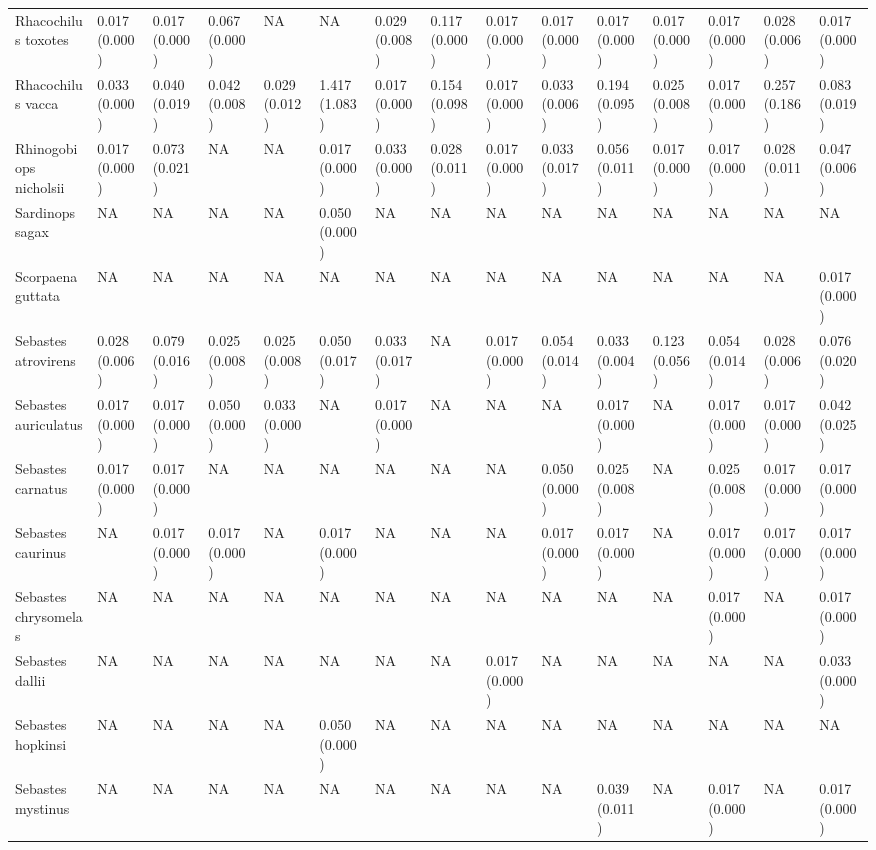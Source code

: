 \documentclass[12pt,]{article}
\begin{document}
\begin{landscape}
\begin{table}
{\begin{tabular}[t]{lllllllllllllll}
Rhacochilus toxotes & 0.017 (0.000) & 0.017 (0.000) & 0.067 (0.000) & NA & NA & 0.029 (0.008) & 0.117 (0.000) & 0.017 (0.000) & 0.017 (0.000) & 0.017 (0.000) & 0.017 (0.000) & 0.017 (0.000) & 0.028 (0.006) & 0.017 (0.000)\\
Rhacochilus vacca & 0.033 (0.000) & 0.040 (0.019) & 0.042 (0.008) & 0.029 (0.012) & 1.417 (1.083) & 0.017 (0.000) & 0.154 (0.098) & 0.017 (0.000) & 0.033 (0.006) & 0.194 (0.095) & 0.025 (0.008) & 0.017 (0.000) & 0.257 (0.186) & 0.083 (0.019)\\
Rhinogobiops nicholsii & 0.017 (0.000) & 0.073 (0.021) & NA & NA & 0.017 (0.000) & 0.033 (0.000) & 0.028 (0.011) & 0.017 (0.000) & 0.033 (0.017) & 0.056 (0.011) & 0.017 (0.000) & 0.017 (0.000) & 0.028 (0.011) & 0.047 (0.006)\\
\addlinespace
Sardinops sagax & NA & NA & NA & NA & 0.050 (0.000) & NA & NA & NA & NA & NA & NA & NA & NA & NA\\
Scorpaena guttata & NA & NA & NA & NA & NA & NA & NA & NA & NA & NA & NA & NA & NA & 0.017 (0.000)\\
Sebastes atrovirens & 0.028 (0.006) & 0.079 (0.016) & 0.025 (0.008) & 0.025 (0.008) & 0.050 (0.017) & 0.033 (0.017) & NA & 0.017 (0.000) & 0.054 (0.014) & 0.033 (0.004) & 0.123 (0.056) & 0.054 (0.014) & 0.028 (0.006) & 0.076 (0.020)\\
Sebastes auriculatus & 0.017 (0.000) & 0.017 (0.000) & 0.050 (0.000) & 0.033 (0.000) & NA & 0.017 (0.000) & NA & NA & NA & 0.017 (0.000) & NA & 0.017 (0.000) & 0.017 (0.000) & 0.042 (0.025)\\
Sebastes carnatus & 0.017 (0.000) & 0.017 (0.000) & NA & NA & NA & NA & NA & NA & 0.050 (0.000) & 0.025 (0.008) & NA & 0.025 (0.008) & 0.017 (0.000) & 0.017 (0.000)\\
\addlinespace
Sebastes caurinus & NA & 0.017 (0.000) & 0.017 (0.000) & NA & 0.017 (0.000) & NA & NA & NA & 0.017 (0.000) & 0.017 (0.000) & NA & 0.017 (0.000) & 0.017 (0.000) & 0.017 (0.000)\\
Sebastes chrysomelas & NA & NA & NA & NA & NA & NA & NA & NA & NA & NA & NA & 0.017 (0.000) & NA & 0.017 (0.000)\\
Sebastes dallii & NA & NA & NA & NA & NA & NA & NA & 0.017 (0.000) & NA & NA & NA & NA & NA & 0.033 (0.000)\\
Sebastes hopkinsi & NA & NA & NA & NA & 0.050 (0.000) & NA & NA & NA & NA & NA & NA & NA & NA & NA\\
Sebastes mystinus & NA & NA & NA & NA & NA & NA & NA & NA & NA & 0.039 (0.011) & NA & 0.017 (0.000) & NA & 0.017 (0.000)\\

\end{tabular}}
\end{table}
\end{landscape}
\end{document}

